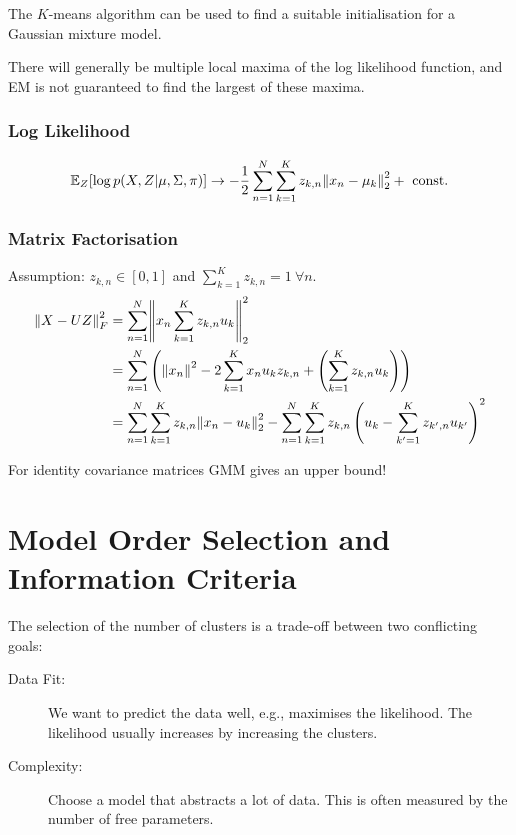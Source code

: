 The $K$-means algorithm can be used to find a suitable initialisation for a Gaussian mixture model.

There will generally be multiple local maxima of the log likelihood function, and EM is not guaranteed to find the largest of these maxima.

\subsubsection{Log Likelihood}
\begin{align*}
    \mathbb E_Z[\log p(X,Z| \mu,\Sigma, \pi)] \rightarrow - {1\over 2} \sum_{n=1}^N\sum_{k=1}^K z_{k,n} \norm{x_n-\mu_k}_2^2 + \text{ const}.
\end{align*}


\subsubsection{Matrix Factorisation}
Assumption: $z_{k,n} \in [0,1]$ and $\sum_{k=1}^K z_{k,n} = 1 \ \forall n$.
\begin{align*}
    \norm{X-UZ}_F^2 &= \sum_{n=1}^N \norm{x_n \sum_{k=1}^K z_{k,n}u_k}_2^2 \\
        &= \sum_{n=1}^N \left( \norm{x_n}^2 -2 \sum_{k=1}^K x_n u_k z_{k,n} + \left( \sum_{k=1}^K z_{k,n}u_k \right)\right)\\
        &= \sum_{n=1}^N\sum_{k=1}^K z_{k,n}\norm{x_n-u_k}_2^2 
            - \sum_{n=1}^N\sum_{k=1}^K z_{k,n} \left( u_k-\sum_{k'=1}^K z_{k',n}u_{k'}\right)^2
\end{align*}

For identity covariance matrices GMM gives an upper bound!

\section{Model Order Selection and Information Criteria}
The selection of the number of clusters is a trade-off between two conflicting goals:
\begin{description}
    \item[Data Fit:] We want to predict the data well, e.g., maximises the likelihood. The likelihood usually increases by increasing the clusters.
    \item[Complexity:] Choose a model that abstracts a lot of data. This is often measured by the number of free parameters.
\end{description}

